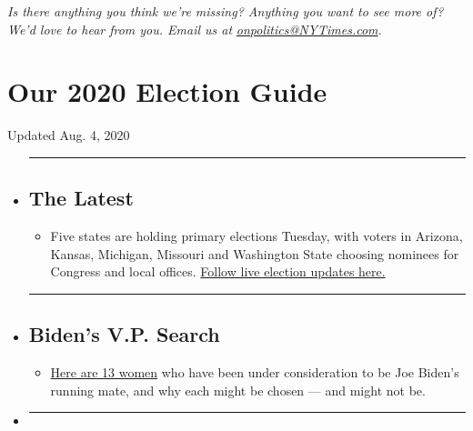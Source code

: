 \emph{Is there anything you think we're missing? Anything you want to
see more of? We'd love to hear from you. Email us at}
\href{mailto:onpolitics@NYTimes.com}{\emph{onpolitics@NYTimes.com}}\emph{.}

\hypertarget{our-2020-election-guide}{%
\section{Our 2020 Election Guide}\label{our-2020-election-guide}}

Updated Aug. 4, 2020

\begin{itemize}
\item
  \begin{center}\rule{0.5\linewidth}{\linethickness}\end{center}

  \hypertarget{the-latest}{%
  \subsection{The Latest}\label{the-latest}}

  \begin{itemize}
  \tightlist
  \item
    Five states are holding primary elections Tuesday, with voters in
    Arizona, Kansas, Michigan, Missouri and Washington State choosing
    nominees for Congress and local offices.
    \href{https://www.nytimes3xbfgragh.onion/2020/08/04/us/elections/primary-election-michigan-arizona-kansas.html?action=click\&pgtype=Article\&state=default\&region=BELOW_MAIN_CONTENT\&context=storylines_guide}{Follow
    live election updates here.}
  \end{itemize}
\item
  \begin{center}\rule{0.5\linewidth}{\linethickness}\end{center}

  \hypertarget{bidens-vp-search}{%
  \subsection{Biden's V.P. Search}\label{bidens-vp-search}}

  \begin{itemize}
  \tightlist
  \item
    \href{https://www.nytimes3xbfgragh.onion/article/biden-vice-president-2020.html?action=click\&pgtype=Article\&state=default\&region=BELOW_MAIN_CONTENT\&context=storylines_guide}{Here
    are 13 women} who have been under consideration to be Joe Biden's
    running mate, and why each might be chosen --- and might not be.
  \end{itemize}
\item
  \begin{center}\rule{0.5\linewidth}{\linethickness}\end{center}


\end{itemize}
